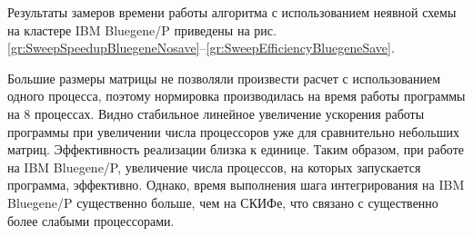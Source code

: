 Результаты замеров времени работы алгоритма с использованием неявной схемы на кластере IBM Bluegene/P приведены на рис. \ref{gr:SweepSpeedupBluegeneNosave}--\ref{gr:SweepEfficiencyBluegeneSave}.

Большие размеры матрицы не позволяли произвести расчет с использованием одного процесса, поэтому нормировка производилась на время работы программы на 8 процессах. Видно стабильное линейное увеличение ускорения работы программы при увеличении числа процессоров уже для сравнительно небольших матриц.
Эффективность реализации близка к единице.
Таким образом, при работе на IBM Bluegene/P, увеличение числа процессов, на которых запускается программа,
эффективно. Однако, время выполнения шага интегрирования на IBM Bluegene/P существенно больше, чем на СКИФе, что связано с существенно более слабыми процессорами. 
